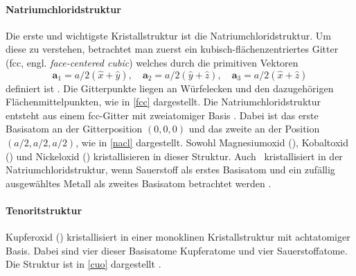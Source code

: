 \paragraph{Natriumchloridstruktur}
Die erste und wichtigste Kristallstruktur ist die Natriumchloridstruktur.
Um diese zu verstehen, betrachtet man zuerst ein kubisch-flächen\-zen\-trier\-tes Gitter (fcc, engl.
\textit{face-centered cubic}) welches durch die primitiven Vektoren
\begin{equation}
    \mathbf{a}_1 = a / 2 (\hat{x} + \hat{y}), \quad
    \mathbf{a}_2 = a / 2 (\hat{y} + \hat{z}), \quad
    \mathbf{a}_3 = a / 2 (\hat{x} + \hat{z})
    \label{eq:fcc}
\end{equation}
definiert ist \autocite{Grundmann}.
Die Gitterpunkte liegen an Würfelecken und den dazugehörigen Flächenmittelpunkten, wie in \cref{fcc} dargestellt.
Die Natriumchloridstruktur entsteht aus einem fcc-Gitter mit zweiatomiger Basis \autocite{Grundmann}.
Dabei ist das erste Basisatom an der Gitterposition $(0,0,0)$ und das zweite an der Position $(a/2,a/2,a/2)$, wie in
\cref{nacl} dargestellt.
Sowohl Magnesiumoxid (), Kobaltoxid () und Nickeloxid () kristallisieren in dieser Struktur.
Auch \heo\ kristallisiert in der Natriumchloridstruktur, wenn
Sauerstoff als erstes Basisatom und ein zufällig ausgewähltes Metall als zweites Basisatom betrachtet werden
\autocite{Rost2015}.

\paragraph{Tenoritstruktur}
Kupferoxid () kristallisiert in einer monoklinen Kristall\-struk\-tur mit achtatomiger Basis.
Dabei sind vier dieser Basisatome Kupferatome und vier Sauerstoffatome.
Die Struktur ist in \cref{cuo} dargestellt \autocite{kupferoxid}.

